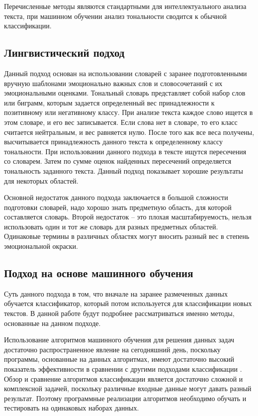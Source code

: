 \documentclass[a4paper,14pt, unknownkeysallowed]{extreport}
\begin{document}
Перечисленные методы являются стандартными для интеллектуального анализа текста, при машинном обучении анализ тональности сводится к обычной классификации.
	
	\subsection{Лингвистический подход}
	
	Данный подход основан на использовании словарей с заранее подготовленными вручную шаблонами эмоционально важных слов и словосочетаний с их эмоциональными оценками. Тональный словарь представляет собой набор слов или биграмм, которым задается определенный вес принадлежности к позитивному или негативному классу. При анализе текста каждое слово ищется в этом словаре, и его вес записывается. Если слова нет в словаре, то его класс считается нейтральным, и вес равняется нулю. После того как все веса получены, высчитывается принадлежность данного текста к определенному классу тональности. При использовании данного подхода в тексте ищутся пересечения со словарем. Затем по сумме оценок найденных пересечений определяется тональность заданного текста. Данный подход показывает хорошие результаты для некоторых областей. 
	
	Основной недостаток данного подхода заключается в большой сложности подготовки словарей, надо хорошо знать предметную область, для которой составляется словарь. Второй недостаток -- это плохая масштабируемость, нельзя использовать один и тот же словарь для разных предметных областей. Одинаковые термины в различных областях могут вносить разный вес в степень эмоциональной окраски.
	
	
	\subsection{Подход на основе машинного обучения}
	
	Суть данного подхода в том, что вначале на заранее размеченных данных обучается классификатор, который потом используется для классификации новых текстов. В данной работе будут подробнее рассматриваться именно методы, основанные на данном подходе.

	Использование алгоритмов машинного обучения для решения данных задач достаточно распространенное явление на сегодняшний день, поскольку программы, основанные на данных алгоритмах, имеют достаточно высокий показатель эффективности в сравнении с другими подходами классификации \cite{Noskov}. Обзор и сравнение алгоритмов классификации является достаточно сложной и комплексной задачей, поскольку различные входные данные могут давать разный результат. Поэтому программные реализации алгоритмов необходимо обучать и тестировать на одинаковых наборах данных.
	
\end{document}
